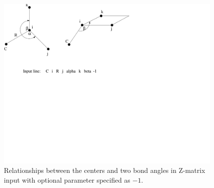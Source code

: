\begin{figure}[htbp]
\begin{latexonly}
\else
\includegraphics[angle=270,width=6in]{zmat3.pdf}
\fi
\end{latexonly}
\begin{htmlonly}
\end{htmlonly}
\caption{\label{fig:zmat3} Relationships between the centers and two
  bond angles in Z-matrix input with optional parameter specified as $-1$.}
\end{figure}

